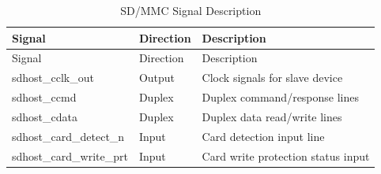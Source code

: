 \begin{longtable}[c]{ |p{5cm}|p{3cm}|p{8cm}| }
\caption{SD/MMC Signal Description} \label{tab:sdhost-signal-description}\\
\hline
\rowcolor{lightgray}
Signal & Direction & Description \\
\hline
\endfirsthead
\hline
\rowcolor{lightgray}
Signal & Direction & Description  \\
\hline
\endhead
\endfoot
sdhost\_cclk\_out & Output & Clock signals for slave device	\\\hline
sdhost\_ccmd & Duplex & Duplex command/response lines  \\\hline
sdhost\_cdata & Duplex & Duplex data read/write lines	\\\hline
sdhost\_card\_detect\_n & Input &  Card detection input line\\\hline
sdhost\_card\_write\_prt & Input & Card write protection status input 	\\\hline
\end{longtable}
